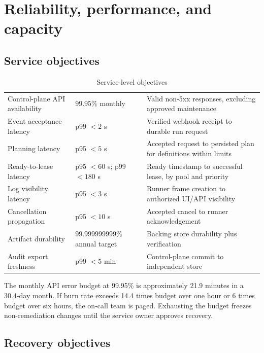 \section{Reliability, performance, and capacity}

\subsection{Service objectives}

\begin{table}[htbp]
\centering
\caption{Service-level objectives}
\label{tab:slos}
\begin{tabularx}{\textwidth}{@{}L{0.30\textwidth}L{0.24\textwidth}Y@{}}
  \toprule
   &  &  \\
  \midrule
  Control-plane API availability & $99.95\%$ monthly & Valid non-5xx responses, excluding approved maintenance \\
  Event acceptance latency & p99 $<2$ s & Verified webhook receipt to durable run request \\
  Planning latency & p95 $<5$ s & Accepted request to persisted plan for definitions within limits \\
  Ready-to-lease latency & p95 $<60$ s; p99 $<180$ s & Ready timestamp to successful lease, by pool and priority \\
  Log visibility latency & p95 $<3$ s & Runner frame creation to authorized UI/API visibility \\
  Cancellation propagation & p95 $<10$ s & Accepted cancel to runner acknowledgement \\
  Artifact durability & $99.999999999\%$ annual target & Backing store durability plus verification \\
  Audit export freshness & p99 $<5$ min & Control-plane commit to independent store \\
  \bottomrule
\end{tabularx}
\end{table}

The monthly API error budget at 99.95\% is approximately 21.9 minutes in a
30.4-day month. If burn rate exceeds 14.4 times budget over one hour or 6 times budget
over six hours, the on-call team is paged. Exhausting the budget freezes non-remediation
changes until the service owner approves recovery.

\subsection{Recovery objectives}

